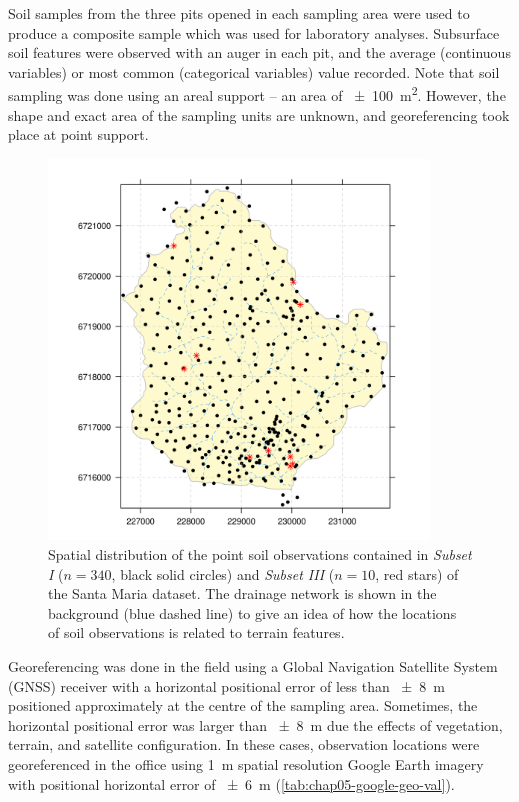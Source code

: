 Soil samples from the three pits opened in each sampling area were used to produce a composite sample which 
was used for laboratory analyses. Subsurface soil features were observed with an auger in each pit, and the 
average (continuous variables) or most common (categorical variables) value recorded. Note that soil sampling 
was done using an areal support -- an area of \SI{\pm100}{\metre\squared}. However, the shape and exact area of 
the sampling units are unknown, and georeferencing took place at point support.

\begin{figure}[!ht]
\centering
\includegraphics[width=0.90\textwidth]{fig/chap04-subsets-I-III}
\caption[Spatial distribution of \emph{Subset I} and \emph{Subset III}.]{Spatial distribution of the point 
soil observations contained in \emph{Subset I} ($n = 340$, black solid circles) and \emph{Subset III} ($n = 
10$, red stars) of the Santa Maria dataset. The drainage network is shown in the background (blue 
dashed line) to give an idea of how the locations of soil observations is related to terrain features.}
\label{fig:chap04-subsets-I-III}
\end{figure}

Georeferencing was done in the field using a Global Navigation Satellite System (GNSS) receiver with a 
horizontal positional error of less than \SI{\pm8}{\metre} positioned approximately at the centre of the
sampling area. Sometimes, the horizontal positional error was larger than \SI{\pm8}{\metre} due the effects
of vegetation, terrain, and satellite configuration. In these cases, observation locations 
were georeferenced in the office using \SI{1}{\metre} spatial resolution Google Earth\rr{} imagery 
with 
positional horizontal error of \SI{\pm6}{\metre} (\autoref{tab:chap05-google-geo-val}).

